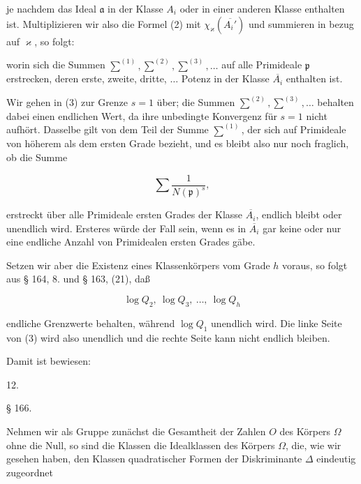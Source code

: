 
je nachdem das Ideal $\mathfrak a$ in der Klasse $A_i$ oder in einer anderen
Klasse enthalten ist. Multiplizieren wir also die Formel (2) mit
$\chi_\varkappa(\overline{A_i'})$ und summieren in bezug auf $\varkappa$, so folgt:

worin sich die Summen $\overset{(1)}{\sum}, \overset{(2)}{\sum}, \overset{(3)}{\sum}, \ldots$ auf alle Primideale $\mathfrak p$ erstrecken,
deren erste, zweite, dritte, $\ldots$ Potenz in der Klasse $\overline{A_i}$ enthalten ist.

Wir gehen in (3) zur Grenze $s = 1$ über; die Summen $\overset{(2)}{\sum}, \overset{(3)}{\sum}, \ldots$
behalten dabei einen endlichen Wert, da ihre unbedingte Konvergenz für $s = 1$ nicht aufhört. Dasselbe gilt von dem Teil
der Summe $\overset{(1)}{\sum}$, der sich auf Primideale von höherem als dem
ersten Grade bezieht, und es bleibt also nur noch fraglich, ob
die Summe

\[
\sum \frac{1}{N(\mathfrak p)^s},
\]

erstreckt über alle Primideale ersten Grades der Klasse $\overline{A_i}$, endlich
bleibt oder unendlich wird. Ersteres würde der Fall sein, wenn
es in $\overline{A_i}$ gar keine oder nur eine endliche Anzahl von Primidealen
ersten Grades gäbe.

Setzen wir aber die Existenz eines Klassenkörpers vom Grade $h$ %
voraus, so folgt aus § 164, 8. und § 163, (21), daß

\[
\log Q_2,\ \log Q_3,\ \ldots,\ \log Q_h
\]

endliche Grenzwerte behalten, während $\log Q_1$ unendlich wird. Die
linke Seite von (3) wird also unendlich und die rechte Seite kann
nicht endlich bleiben.

Damit ist bewiesen:

12. 

\begin{center}
§ 166. \textbf{}
\end{center}

Nehmen wir als Gruppe zunächst die Gesamtheit der Zahlen $O$
des Körpers $\Omega$ ohne die Null, so sind die Klassen die Idealklassen
 des Körpers $\Omega$, die, wie wir gesehen haben, den Klassen
quadratischer Formen der Diskriminante $\varDelta$ eindeutig zugeordnet
